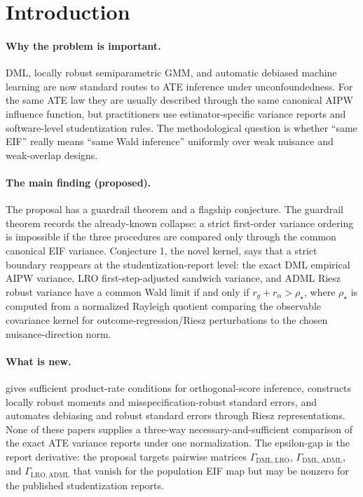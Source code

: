 \documentclass[11pt]{article}
\theoremstyle{definition}
\theoremstyle{plain}
\theoremstyle{remark}
\begin{document}
\section{Introduction}
\paragraph{Why the problem is important.}
DML, locally robust semiparametric GMM, and automatic debiased machine learning
are now standard routes to ATE inference under unconfoundedness.  For the same
ATE law they are usually described through the same canonical AIPW influence
function, but practitioners use estimator-specific variance reports and
software-level studentization rules.  The methodological question is whether
``same EIF'' really means ``same Wald inference'' uniformly over weak
nuisance and weak-overlap designs.

\paragraph{The main finding (proposed).}
The proposal has a guardrail theorem and a flagship conjecture.  The guardrail
theorem records the already-known collapse: a strict first-order variance
ordering is impossible if the three procedures are compared only through the
common canonical EIF variance.
Conjecture 1, the novel kernel, says that a strict boundary reappears at the
studentization-report level: the exact DML empirical AIPW variance, LRO
first-step-adjusted sandwich variance, and ADML Riesz robust variance have a
common Wald limit if and only if \(r_g+r_\alpha>\rho_\star\), where
\(\rho_\star\) is computed from a normalized Rayleigh quotient comparing the
observable covariance kernel for outcome-regression/Riesz perturbations to the
chosen nuisance-direction norm.

\paragraph{What is new.}
\citet{ChernozhukovEtAl2018ECTJ} gives sufficient product-rate conditions for
orthogonal-score inference, \citet{ChernozhukovEscancianoIchimuraNeweyRobins2022LRO}
constructs locally robust moments and misspecification-robust standard errors,
and \citet{ChernozhukovNeweySingh2022ADML} automates debiasing and robust
standard errors through Riesz representations.  None of these papers supplies
a three-way necessary-and-sufficient comparison of the exact ATE variance
reports under one normalization.  The epsilon-gap is the report derivative:
the proposal targets pairwise matrices \(\Gamma_{\mathrm{DML},\mathrm{LRO}}\),
\(\Gamma_{\mathrm{DML},\mathrm{ADML}}\), and
\(\Gamma_{\mathrm{LRO},\mathrm{ADML}}\) that vanish for the population EIF
map but may be nonzero for the published studentization reports.
\end{document}
